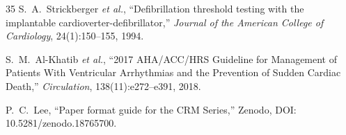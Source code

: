 \documentclass[11pt,a4paper]{article}
\theoremstyle{plain}
\theoremstyle{definition}
\begin{document}
\begin{thebibliography}{35}
S.~A.~Strickberger \textit{et al.},
``Defibrillation threshold testing with the implantable cardioverter-defibrillator,''
\textit{Journal of the American College of Cardiology}, 24(1):150--155, 1994.

S.~M.~Al-Khatib \textit{et al.},
``2017 AHA/ACC/HRS Guideline for Management of Patients With Ventricular Arrhythmias and the Prevention of Sudden Cardiac Death,''
\textit{Circulation}, 138(11):e272--e391, 2018.

P.~C.~Lee,
``Paper format guide for the CRM Series,''
Zenodo, DOI: 10.5281/zenodo.18765700.

\end{thebibliography}
\end{document}

